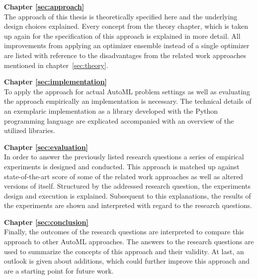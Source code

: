 \textbf{Chapter \ref{sec:approach}} \\[0.2em]
The approach of this thesis is theoretically specified here and the underlying design choices explained.
Every concept from the theory chapter, which is taken up again for the specification of this approach is explained in more detail.
All improvements from applying an optimizer ensemble instead of a single optimizer are listed with reference to the disadvantages from the related work approaches mentioned in chapter~\ref{sec:theory}.

\textbf{Chapter \ref{sec:implementation}} \\[0.2em]
To apply the approach for actual AutoML problem settings as well as evaluating the approach empirically an implementation is necessary.
The technical details of an exemplaric implementation as a library developed with the Python programming language are explicated accompanied with an overview of the utilized libraries.

\textbf{Chapter \ref{sec:evaluation}} \\[0.2em]
In order to answer the previously listed research questions a series of empirical experiments is designed and conducted.
This approach is matched up against state-of-the-art score of some of the related work approaches as well as altered versions of itself.
Structured by the addressed research question, the experiments design and execution is explained.
Subsequent to this explanations, the results of the experiments are shown and interpreted with regard to the research questions.

\textbf{Chapter \ref{sec:conclusion}} \\[0.2em]
Finally, the outcomes of the research questions are interpreted to compare this approach to other AutoML approaches.
The answers to the research questions are used to summarize the concepts of this approach and their validity.
At last, an outlook is given about additions, which could further improve this approach and are a starting point for future work.
